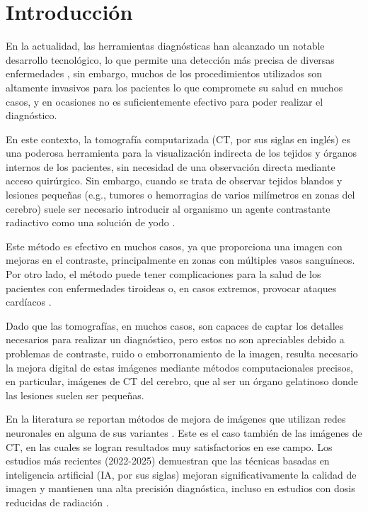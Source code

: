 \chapter*{Introducción}\label{chapter:introduction}
En la actualidad, las herramientas diagnósticas han alcanzado un notable desarrollo tecnológico, lo que permite una detección más precisa de diversas enfermedades \cite{semmlow2008biosignal}, sin embargo, muchos de los procedimientos utilizados son altamente invasivos para los pacientes lo que compromete su salud en muchos casos, y en ocasiones no es suficientemente efectivo para poder realizar el diagnóstico.

En este contexto, la tomografía computarizada (CT, por sus siglas en inglés) es una poderosa herramienta para la visualización indirecta de los tejidos y órganos internos de los pacientes, sin necesidad de una observación directa mediante acceso quirúrgico. Sin embargo, cuando se trata de observar tejidos blandos y lesiones pequeñas (e.g., tumores o hemorragias de varios milímetros en zonas del cerebro) suele ser necesario introducir al organismo un agente contrastante radiactivo como una solución de yodo \cite{InsideRadiologyICCM}.

Este método es efectivo en muchos casos, ya que proporciona una imagen con mejoras en el contraste, principalmente en zonas con múltiples vasos sanguíneos. Por otro lado, el método puede tener complicaciones para la salud de los pacientes con enfermedades tiroideas o, en casos extremos, provocar ataques cardíacos \cite{IodineTyroids,IodineHeathAttack}.

Dado que las tomografías, en muchos casos, son capaces de captar los detalles necesarios para realizar un diagnóstico, pero estos no son apreciables debido a problemas de contraste, ruido o emborronamiento de la imagen, resulta necesario la mejora digital de estas imágenes mediante métodos computacionales precisos, en particular, imágenes de CT del cerebro, que al ser un órgano gelatinoso donde las lesiones suelen ser pequeñas. 

En la literatura se reportan métodos de mejora de imágenes que utilizan redes neuronales en alguna de sus variantes \cite{ULTRA,DLR,LEARN++,EDCNN}. Este es el caso también de las imágenes de CT, en las cuales se logran resultados muy satisfactorios en ese campo. Los estudios más recientes (2022-2025) demuestran que las técnicas basadas en inteligencia artificial (IA, por sus siglas) mejoran significativamente la calidad de imagen y mantienen una alta precisión diagnóstica, incluso en estudios con dosis reducidas de radiación \cite{AISurveyOnImageQuality}.

